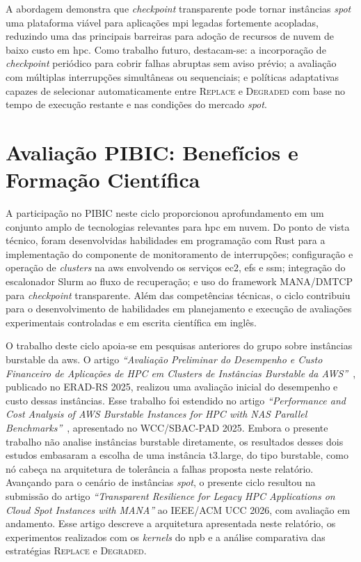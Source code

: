 \documentclass[a4paper,11pt]{article}
\begin{document}
        A abordagem demonstra que \textit{checkpoint} transparente pode tornar
        instâncias \textit{spot} uma plataforma viável para aplicações \gls{mpi}
        legadas fortemente acopladas, reduzindo uma das principais barreiras para
        adoção de recursos de nuvem de baixo custo em \gls{hpc}. Como trabalho
        futuro, destacam-se: a incorporação de \textit{checkpoint} periódico para
        cobrir falhas abruptas sem aviso prévio; a avaliação com múltiplas
        interrupções simultâneas ou sequenciais; e políticas adaptativas capazes de
        selecionar automaticamente entre \textsc{Replace} e \textsc{Degraded} com
        base no tempo de execução restante e nas condições do mercado
        \textit{spot}.

    \section{Avaliação PIBIC: Benefícios e Formação Científica}

        A participação no PIBIC neste ciclo proporcionou aprofundamento em um
        conjunto amplo de tecnologias relevantes para \gls{hpc} em nuvem. Do
        ponto de vista técnico, foram desenvolvidas habilidades em programação com
        Rust para a implementação do componente de monitoramento de interrupções;
        configuração e operação de \textit{clusters} na \gls{aws} envolvendo os
        serviços \gls{ec2}, \gls{efs} e \gls{ssm}; integração do escalonador Slurm
        ao fluxo de recuperação; e uso do framework MANA/DMTCP para
        \textit{checkpoint} transparente. Além das competências técnicas, o ciclo
        contribuiu para o desenvolvimento de habilidades em planejamento e execução
        de avaliações experimentais controladas e em escrita científica em inglês.

        O trabalho deste ciclo apoia-se em pesquisas anteriores do grupo sobre
        instâncias burstable da \gls{aws}. O artigo \textit{``Avaliação
        Preliminar do Desempenho e Custo Financeiro de Aplicações de {HPC} em
        Clusters de Instâncias Burstable da {AWS}''}~\cite{soda2025erad},
        publicado no ERAD-RS 2025, realizou uma avaliação inicial do desempenho e
        custo dessas instâncias. Esse trabalho foi estendido no artigo
        \textit{``Performance and Cost Analysis of {AWS} Burstable Instances for
        {HPC} with {NAS} Parallel Benchmarks''}~\cite{soda2025wcc}, apresentado
        no WCC/SBAC-PAD 2025. Embora o presente trabalho não analise instâncias
        burstable diretamente, os resultados desses dois estudos embasaram a
        escolha de uma instância t3.large, do tipo burstable, como nó cabeça na
        arquitetura de tolerância a falhas proposta neste relatório. Avançando
        para o cenário de instâncias \textit{spot}, o presente ciclo resultou na
        submissão do artigo \textit{``Transparent Resilience for Legacy HPC
        Applications on Cloud Spot Instances with MANA''} ao IEEE/ACM UCC 2026,
        com avaliação em andamento. Esse artigo descreve a arquitetura apresentada
        neste relatório, os experimentos realizados com os \textit{kernels} do
        \gls{npb} e a análise comparativa das estratégias \textsc{Replace} e
        \textsc{Degraded}.
\end{document}
